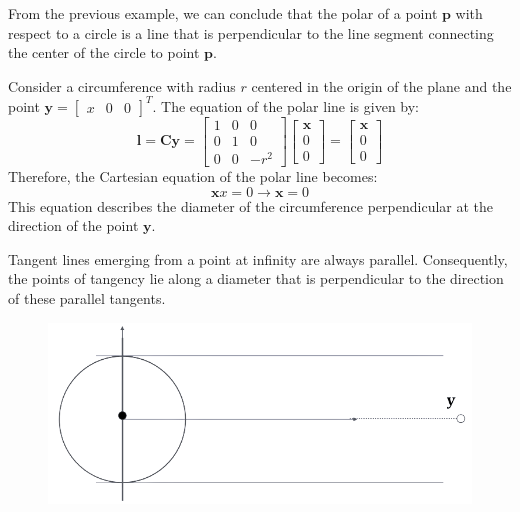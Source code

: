 From the previous example, we can conclude that the polar of a point $\mathbf{p}$ with respect to a circle is a line that is perpendicular to the line segment connecting the center of the circle to point $\mathbf{p}$. 
\begin{example}
    Consider a circumference with radius $r$ centered in the origin of the plane and the point $\mathbf{y}={\begin{bmatrix} x & 0 & 0 \end{bmatrix}}^T$.
    The equation of the polar line is given by:
    \[\mathbf{l}=\mathbf{Cy} = \begin{bmatrix} 1 & 0 & 0 \\ 0 & 1 & 0 \\ 0 & 0 & -r^2 \end{bmatrix} \begin{bmatrix} \mathbf{x} \\ 0 \\ 0 \end{bmatrix} =  \begin{bmatrix} \mathbf{x} \\ 0 \\ 0 \end{bmatrix}\]
    Therefore, the Cartesian equation of the polar line becomes: 
    \[\mathbf{x} x=0 \rightarrow \mathbf{x}=0\]
    This equation describes the diameter of the circumference perpendicular at the direction of the point $\mathbf{y}$. 
\end{example}
Tangent lines emerging from a point at infinity are always parallel. 
Consequently, the points of tangency lie along a diameter that is perpendicular to the direction of these parallel tangents.    
\begin{figure}[H]
    \centering
    \includegraphics[width=0.5\linewidth]{images/parallel.png}
\end{figure}
